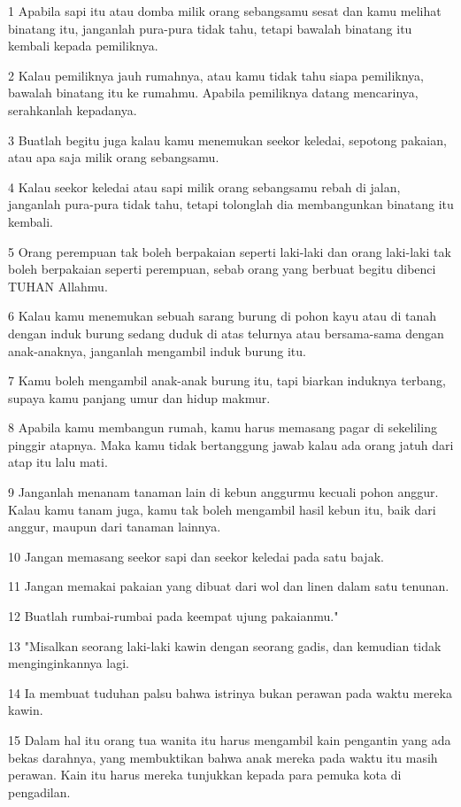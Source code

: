 \par 1 Apabila sapi itu atau domba milik orang sebangsamu sesat dan kamu melihat binatang itu, janganlah pura-pura tidak tahu, tetapi bawalah binatang itu kembali kepada pemiliknya.
\par 2 Kalau pemiliknya jauh rumahnya, atau kamu tidak tahu siapa pemiliknya, bawalah binatang itu ke rumahmu. Apabila pemiliknya datang mencarinya, serahkanlah kepadanya.
\par 3 Buatlah begitu juga kalau kamu menemukan seekor keledai, sepotong pakaian, atau apa saja milik orang sebangsamu.
\par 4 Kalau seekor keledai atau sapi milik orang sebangsamu rebah di jalan, janganlah pura-pura tidak tahu, tetapi tolonglah dia membangunkan binatang itu kembali.
\par 5 Orang perempuan tak boleh berpakaian seperti laki-laki dan orang laki-laki tak boleh berpakaian seperti perempuan, sebab orang yang berbuat begitu dibenci TUHAN Allahmu.
\par 6 Kalau kamu menemukan sebuah sarang burung di pohon kayu atau di tanah dengan induk burung sedang duduk di atas telurnya atau bersama-sama dengan anak-anaknya, janganlah mengambil induk burung itu.
\par 7 Kamu boleh mengambil anak-anak burung itu, tapi biarkan induknya terbang, supaya kamu panjang umur dan hidup makmur.
\par 8 Apabila kamu membangun rumah, kamu harus memasang pagar di sekeliling pinggir atapnya. Maka kamu tidak bertanggung jawab kalau ada orang jatuh dari atap itu lalu mati.
\par 9 Janganlah menanam tanaman lain di kebun anggurmu kecuali pohon anggur. Kalau kamu tanam juga, kamu tak boleh mengambil hasil kebun itu, baik dari anggur, maupun dari tanaman lainnya.
\par 10 Jangan memasang seekor sapi dan seekor keledai pada satu bajak.
\par 11 Jangan memakai pakaian yang dibuat dari wol dan linen dalam satu tenunan.
\par 12 Buatlah rumbai-rumbai pada keempat ujung pakaianmu."
\par 13 "Misalkan seorang laki-laki kawin dengan seorang gadis, dan kemudian tidak menginginkannya lagi.
\par 14 Ia membuat tuduhan palsu bahwa istrinya bukan perawan pada waktu mereka kawin.
\par 15 Dalam hal itu orang tua wanita itu harus mengambil kain pengantin yang ada bekas darahnya, yang membuktikan bahwa anak mereka pada waktu itu masih perawan. Kain itu harus mereka tunjukkan kepada para pemuka kota di pengadilan.
